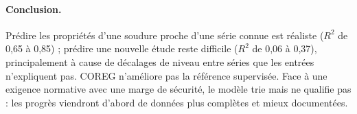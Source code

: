 \documentclass[11pt,a4paper]{article}
\begin{document}
\paragraph{Conclusion.} Prédire les propriétés d'une soudure proche d'une série
connue est réaliste ($R^2$ de 0,65 à 0,85) ; prédire une nouvelle étude reste
difficile ($R^2$ de 0,06 à 0,37), principalement à cause de décalages de niveau
entre séries que les entrées n'expliquent pas. COREG n'améliore pas la
référence supervisée. Face à une exigence normative avec une marge de sécurité,
le modèle trie mais ne qualifie pas : les progrès viendront d'abord de données
plus complètes et mieux documentées.

\medskip
{}

{\footnotesize
\setlength{\bibsep}{0.1em}

\renewcommand{\refname}{Références bibliographiques}

}
\end{document}

